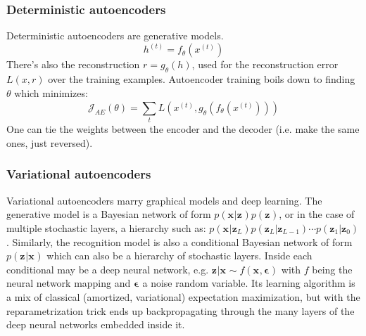 \subsubsection{Deterministic autoencoders}
Deterministic autoencoders are generative models.
\begin{equation}
		h^{ (t) } = f_{ \theta } (x^{ (t) })
\end{equation}
There's also the reconstruction $ r = g_{ \theta } (h)  $,
used for the reconstruction error $ L (x,r)  $ over the
training examples.
Autoencoder training boils down to finding $ \theta  $
which minimizes:
\begin{equation}
		\mathcal{J}_{ AE } (\theta) =
		\sum_{t}^{} L (x^{ (t) }, g_{ \theta } (f_{ \theta } (x^{ (t) })))
\end{equation}
One can tie the weights between the encoder and the decoder (i.e. make the same ones,
just reversed).




\subsubsection{Variational autoencoders}
Variational autoencoders marry graphical models and deep learning.
The generative model is a Bayesian network of form
$ p (\bm{x}_{}| \bm{z}_{})p (\bm{z}_{})  $,
or in the case of multiple stochastic layers, a hierarchy such as:
$ p (\bm{x}_{}| \bm{z}_{L})p (\bm{z}_{L}|\bm{z}_{L-1})\cdots p (\bm{z}_{1}|\bm{z}_{0})  $.
Similarly, the recognition model is also a conditional Bayesian network of
form $ p (\bm{z}_{}|\bm{x}_{})  $ which can also be a hierarchy of
stochastic layers.
Inside each conditional may be a deep neural network,
e.g. $ \bm{z}_{}|\bm{x}_{} \sim f (\bm{x}_{}, \bm{\epsilon}_{})  $
with $ f  $ being the neural network mapping and $ \bm{\epsilon}_{}  $ a
noise random variable.
Its learning algorithm is a mix of classical (amortized, variational)
expectation maximization, but with the reparametrization trick
ends up backpropagating through the many layers of the deep neural networks
embedded inside it.


